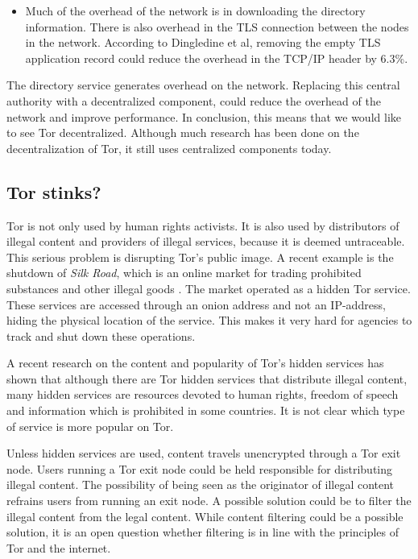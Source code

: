 \documentclass[12pt,journal,compsoc]{IEEEtran}
\begin{document}
\begin{itemize}
			\item Much of the overhead of the network is in downloading the directory information. There is also overhead in the TLS connection between the nodes in the network. According to Dingledine et al, removing the empty TLS application record could reduce the overhead in the TCP/IP header by 6.3\%.	
		\end{itemize}
		
		The directory service generates overhead on the network. Replacing this central authority with a decentralized component, could reduce the overhead of the network and improve performance. In conclusion, this means that we would like to see Tor decentralized. Although much research has been done on the decentralization of Tor, it still uses centralized components today.

		\subsection{Tor stinks?}
			Tor is not only used by human rights activists. It is also used by distributors of illegal content and providers of illegal services, because it is deemed untraceable. This serious problem is disrupting Tor's public image. A recent example is the shutdown of \emph{Silk Road}, which is an online market for trading prohibited substances and other illegal goods \cite{ibtimes2013}. The market operated as a hidden Tor service. These services are accessed through an onion address and not an IP-address, hiding the physical location of the service. This makes it very hard for agencies to track and shut down these operations.


			A recent research on the content and popularity of Tor's hidden services \cite{biryukov2013content} has shown that although there are Tor hidden services that distribute illegal content, many hidden services are resources devoted to human rights, freedom of speech and information which is prohibited in some countries. It is not clear which type of service is more popular on Tor.

			Unless hidden services are used, content travels unencrypted through a Tor exit node. Users running a Tor exit node could be held responsible for distributing illegal content. The possibility of being seen as the originator of illegal content refrains users from running an exit node. A possible solution could be to filter the illegal content from the legal content. While content filtering could be a possible solution, it is an open question whether filtering is in line with the principles of Tor and the internet.
		
\end{document}
